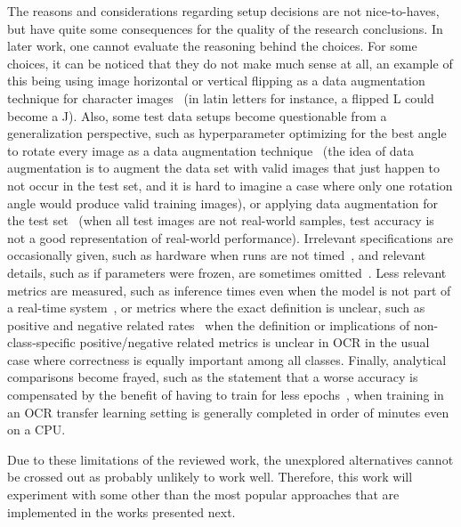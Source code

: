 \documentclass[english,twoside,openright]{UH_DS_MSc}
\begin{document}
The reasons and considerations regarding setup decisions are not nice-to-haves, 
but have quite some consequences for the quality of the research conclusions. In later work, one cannot evaluate
 the reasoning behind the choices. For some choices, it can be noticed that they do not make much sense at all, an example of this being 
 using image horizontal or vertical flipping as a data augmentation technique for character images~\cite{9thuonPalm}
 (in latin letters for instance, a flipped L could become a J). Also, some test data setups become questionable from a 
 generalization perspective, such as hyperparameter optimizing for the best angle to rotate every image 
 as a data augmentation technique~\cite{7rizkybasicCnnTransfer} (the idea of data augmentation is to augment
  the data set with valid images that just happen to not occur in the test set, 
  and it is hard to imagine a case where only one rotation angle would produce valid training images), 
  or applying data augmentation for the test set~\cite{11zunairUnconventionalWisdom} (when all test images are not real-world samples, 
  test accuracy is not a good representation of real-world performance). 
  Irrelevant specifications are occasionally given, such as hardware when runs are not timed~\cite{9thuonPalm}, and relevant details, 
  such as if parameters were frozen, are sometimes omitted~\cite{8goelGujarati2023}.
  Less relevant metrics are measured, such as inference times even when the model is not part of a real-time system~\cite{8goelGujarati2023},
  or metrics where the exact definition is unclear, such as positive and negative related rates~\cite{10goelGujarati, 5rasheedHandwrittenUrduWAlexNet} when the definition or implications
  of non-class-specific positive/negative related metrics is unclear in OCR in the usual case where correctness is equally important
  among all classes. Finally, analytical comparisons become frayed, such as the statement that a worse accuracy is compensated by the
   benefit of having to train for less epochs~\cite{3chatterjeeBengali}, when training in an OCR transfer learning setting is generally completed in order of minutes even on a CPU.

Due to these limitations of the reviewed work, the unexplored alternatives cannot be crossed out as probably unlikely to work well. Therefore, this work will experiment with some other than the most popular approaches that are implemented in the works presented next.

\end{document}
